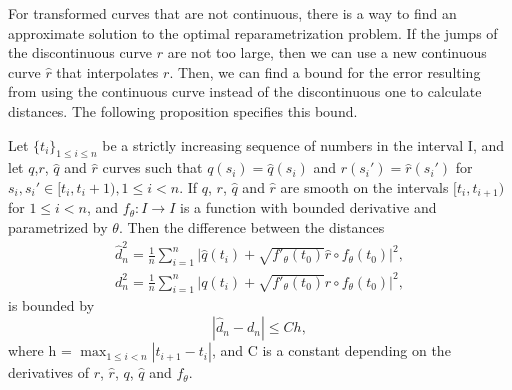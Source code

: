 For transformed curves that are not continuous, there is a way to find an approximate solution to the optimal reparametrization problem. If the jumps of the discontinuous curve \(r\) are not too large, then we can use a new continuous curve \(\hat r\) that interpolates \(r\). Then, we can find a bound for the error resulting from using the continuous curve instead of the discontinuous one to calculate distances. The following proposition specifies this bound.
\begin{proposition}\label{prop:distance_difference}
  Let \({\{t_i\}}_{1 \leq i\leq n}\) be a strictly increasing sequence of numbers in the interval I, and let \(q\),\(r\), \(\hat q\) and  \(\hat r\) curves such that \(q(s_i)=\hat q(s_i)\) and \(r(s_i')=\hat r(s_i')\) for \(s_i, s_i' \in [t_i, t_i+1), 1\leq i < n\). If  \(q\),  \(r\),   \(\hat q\) and  \(\hat r\) are smooth on the intervals  \([t_i, t_{i+1})\) for  \( 1 \leq i <n\), and  \(f_\theta : I \rightarrow I\) is a function with bounded derivative and parametrized by \( \theta \). Then the difference between the distances
  \begin{align*}
    \hat d_n^2=\frac{1}{n}\sum_{i=1}^{n}\Big|\hat q(t_i) + \sqrt{f'_{\theta}(t_0)} \hat r \circ f_{\theta}(t_0)\Big|^2, \\
    d_n^2=\frac{1}{n}\sum_{i=1}^{n}\Big|q(t_i) + \sqrt{f'_{\theta}(t_0)} r \circ f_{\theta}(t_0)\Big|^2,
  \end{align*}
  is bounded by
  \begin{equation*}
    | \hat d_n -d_n | \leq  C h,
  \end{equation*}
  where h = \(\max_{1\leq i<n}|t_{i+1} - t_{i} |\), and C is a constant depending on the derivatives of  \(r\),  \(\hat{r}\),  \(q\),  \(\hat q\) and  \(f_{\theta}\).
\end{proposition}
